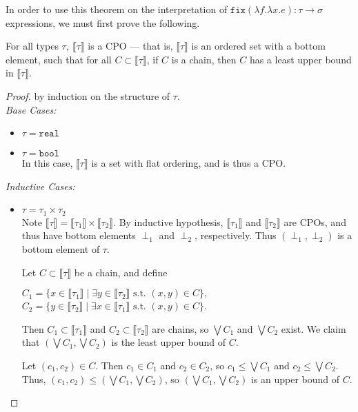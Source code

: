 In order to use this theorem on the interpretation of $\texttt{fix}(\lambda f. \lambda x.e): \tau \rightarrow \sigma$ expressions, 
we must first prove the following.
\begin{thm}
For all types $\tau, \ \llbracket \tau \rrbracket$ is a CPO --- that is, $\llbracket \tau \rrbracket$ is an ordered 
set with a bottom element, such that for all $ C \subset \llbracket \tau \rrbracket$, if  $C$ is a chain, then $C$ has a least 
upper bound in $\llbracket \tau \rrbracket$. 
\end{thm}
\begin{proof}
by induction on the structure of $\tau$. \\
\emph{Base Cases: }
\begin{itemize}
\item $\tau = \texttt{real}$
\item $\tau = \texttt{bool}$ \\
In this case, $\llbracket \tau \rrbracket$ is a set with flat ordering, and is thus a CPO. 
\end{itemize}
\emph{Inductive Cases: }
\begin{itemize}
\item $\tau = \tau_1 \times \tau_2$  \\
Note $\llbracket \tau \rrbracket = \llbracket \tau_1 \rrbracket \times \llbracket \tau_2 \rrbracket$. By inductive hypothesis,
$\llbracket \tau_1 \rrbracket$ and $\llbracket \tau_2 \rrbracket$ are CPOs, and thus have bottom elements $\perp_1$ and $
\perp_2$, respectively. Thus $(\perp_1, \perp_2)$ is a bottom element of $\tau$. 

Let $C \subset \llbracket \tau \rrbracket$ be a
chain, and define
\begin{center}
$C_1 = \{x \in \llbracket \tau_1 \rrbracket \mid \exists y \in \llbracket \tau_2 \rrbracket \text{ s.t. } (x,y) \in C\},$ \\
$C_2 = \{ y \in \llbracket \tau_2 \rrbracket\mid \exists x \in \llbracket \tau_1 \rrbracket \text{ s.t. } (x,y) \in C\}$. \\ 
\end{center}
Then $C_1 \subset \llbracket \tau_1 \rrbracket$ and $C_2 \subset \llbracket \tau_2 \rrbracket$ are chains, so $\bigvee C_1$
and $\bigvee C_2$ exist. We claim that $(\bigvee C_1, \bigvee C_2)$ is the least upper bound of $C$. 

Let $(c_1, c_2) \in C$. Then $c_1 \in C_1$ and $c_2 \in C_2$, so $c_1 \leq \bigvee C_1$ and $c_2 \leq \bigvee C_2$. Thus, 
$(c_1, c_2) \leq (\bigvee C_1, \bigvee C_2)$, so $(\bigvee C_1, \bigvee C_2)$ is an upper bound of $C$.


\end{itemize}
\end{proof}
